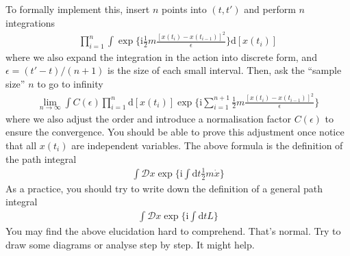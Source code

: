 \documentclass[letterpaper,10pt,english]{sphinxmanual}
\begin{document}
To formally implement this, insert \(n\) points into \((t,t')\) and perform \(n\) integrations
\begin{equation*}
\begin{split}\prod_{i=1}^{n}\int\exp\{\mathrm{i}\frac{1}{2}m\frac{[x(t_i)-x(t_{i-1})]^2}{\epsilon}\}\mathrm{d}[x(t_i)]\end{split}
\end{equation*}
where we also expand the integration in the action into discrete form, and \(\epsilon = (t'-t)/(n+1)\) is the size of each small interval. Then, ask the ``sample size'' \(n\) to go to infinity
\begin{equation*}
\begin{split}\lim_{n\rightarrow\infty}\int C(\epsilon)\prod_{i=1}^{n}\mathrm{d}[x(t_i)]\exp\{\mathrm{i}\sum_{i=1}^{n+1}\frac{1}{2}m\frac{[x(t_i)-x(t_{i-1})]^2}{\epsilon}\}\end{split}
\end{equation*}
where we also adjust the order and introduce a normalisation factor \(C(\epsilon)\) to ensure the convergence. You should be able to prove this adjustment once notice that all \(x(t_i)\) are independent variables. The above formula is the definition of the path integral
\begin{equation*}
\begin{split}\int\mathcal{D}x\exp\{\mathrm{i}\int\mathrm{d}t\frac{1}{2}m\dot{x}\}\end{split}
\end{equation*}
As a practice, you should try to write down the definition of a general path integral
\begin{equation*}
\begin{split}\int\mathcal{D}x\exp\{\mathrm{i}\int\mathrm{d}t L\}\end{split}
\end{equation*}
You may find the above elucidation hard to comprehend. That's normal. Try to draw some diagrams or analyse step by step. It might help.
\end{document}
